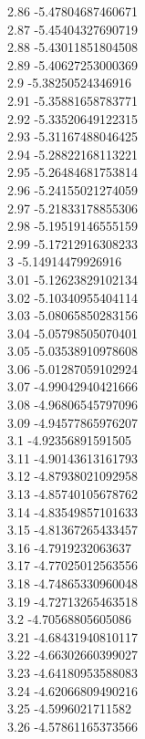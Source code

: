 {2.86	-5.47804687460671\\
2.87	-5.45404327690719\\
2.88	-5.43011851804508\\
2.89	-5.40627253000369\\
2.9	-5.38250524346916\\
2.91	-5.35881658783771\\
2.92	-5.33520649122315\\
2.93	-5.31167488046425\\
2.94	-5.28822168113221\\
2.95	-5.26484681753814\\
2.96	-5.24155021274059\\
2.97	-5.21833178855306\\
2.98	-5.19519146555159\\
2.99	-5.17212916308233\\
3	-5.14914479926916\\
3.01	-5.12623829102134\\
3.02	-5.10340955404114\\
3.03	-5.08065850283156\\
3.04	-5.05798505070401\\
3.05	-5.03538910978608\\
3.06	-5.01287059102924\\
3.07	-4.99042940421666\\
3.08	-4.96806545797096\\
3.09	-4.94577865976207\\
3.1	-4.92356891591505\\
3.11	-4.90143613161793\\
3.12	-4.87938021092958\\
3.13	-4.85740105678762\\
3.14	-4.83549857101633\\
3.15	-4.81367265433457\\
3.16	-4.7919232063637\\
3.17	-4.77025012563556\\
3.18	-4.74865330960048\\
3.19	-4.72713265463518\\
3.2	-4.70568805605086\\
3.21	-4.68431940810117\\
3.22	-4.66302660399027\\
3.23	-4.64180953588083\\
3.24	-4.62066809490216\\
3.25	-4.5996021711582\\
3.26	-4.57861165373566\\
}
